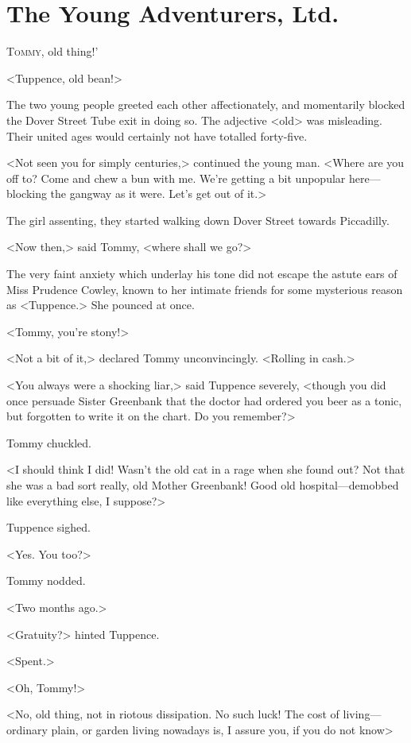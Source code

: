 \chapter{The Young Adventurers, Ltd.} 

 \lettrine[ante=`]{T}{ommy,}  old thing!'

\zz
<Tuppence, old bean!>

\zz
The two young people greeted each other affectionately, and momentarily blocked the Dover Street Tube exit in doing so. The adjective <old> was misleading. Their united ages would certainly not have totalled forty-five.

<Not seen you for simply centuries,> continued the young man. <Where are you off to? Come and chew a bun with me. We're getting a bit unpopular here—blocking the gangway as it were. Let's get out of it.>

The girl assenting, they started walking down Dover Street towards Piccadilly.

<Now then,> said Tommy, <where shall we go?>

The very faint anxiety which underlay his tone did not escape the astute ears of Miss Prudence Cowley, known to her intimate friends for some mysterious reason as <Tuppence.> She pounced at once.

<Tommy, you're stony!>

<Not a bit of it,> declared Tommy unconvincingly. <Rolling in cash.>

<You always were a shocking liar,> said Tuppence severely, <though you did once persuade Sister Greenbank that the doctor had ordered you beer as a tonic, but forgotten to write it on the chart. Do you remember?>

Tommy chuckled.

<I should think I did! Wasn't the old cat in a rage when she found out? Not that she was a bad sort really, old Mother Greenbank! Good old hospital—demobbed like everything else, I suppose?>

Tuppence sighed.

<Yes. You too?>

Tommy nodded.

<Two months ago.>

<Gratuity?> hinted Tuppence.

<Spent.>

<Oh, Tommy!>

<No, old thing, not in riotous dissipation. No such luck! The cost of living—ordinary plain, or garden living nowadays is, I assure you, if you do not know\longdash>

